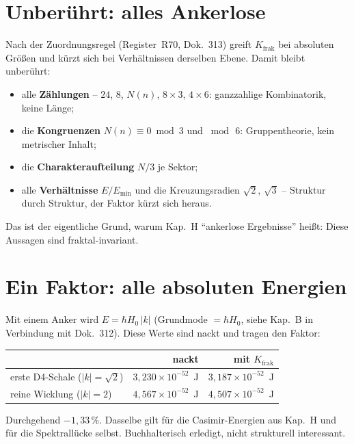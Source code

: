 \section{Unberührt: alles Ankerlose}

Nach der Zuordnungsregel (Register~R70, Dok.~313) greift
$K_\text{frak}$ bei absoluten Größen und kürzt sich bei
Verhältnissen derselben Ebene. Damit bleibt unberührt:

\begin{itemize}
  \item alle \textbf{Zählungen} -- $24$, $8$, $N(n)$, $8\times3$,
        $4\times6$: ganzzahlige Kombinatorik, keine Länge;
  \item die \textbf{Kongruenzen} $N(n)\equiv0 \bmod 3$ und
        $\bmod\,6$: Gruppentheorie, kein metrischer Inhalt;
  \item die \textbf{Charakteraufteilung} $N/3$ je Sektor;
  \item alle \textbf{Verhältnisse} $E/E_\text{min}$ und die
        Kreuzungsradien $\sqrt2$, $\sqrt3$ -- Struktur durch
        Struktur, der Faktor kürzt sich heraus.
\end{itemize}

\noindent Das ist der eigentliche Grund, warum Kap.~H
\enquote{ankerlose Ergebnisse} heißt: Diese Aussagen sind
fraktal-invariant.

\section{Ein Faktor: alle absoluten Energien}

Mit einem Anker wird $E = \hbar H_0\,|k|$ (Grundmode $= \hbar H_0$,
siehe Kap.~B in Verbindung mit Dok.~312). Diese Werte sind nackt und
tragen den Faktor:

\begin{center}
\begin{tabular}{lrr}
\toprule
 & nackt & mit $K_\text{frak}$ \\
\midrule
erste D4-Schale ($|k| = \sqrt2$) & $3{,}230\times10^{-52}$~J &
  $3{,}187\times10^{-52}$~J \\
reine Wicklung ($|k| = 2$) & $4{,}567\times10^{-52}$~J &
  $4{,}507\times10^{-52}$~J \\
\bottomrule
\end{tabular}
\end{center}

\noindent Durchgehend $-1{,}33\,\%$. Dasselbe gilt für die
Casimir-Energien aus Kap.~H und für die Spektrallücke selbst.
Buchhalterisch erledigt, nicht strukturell interessant.

